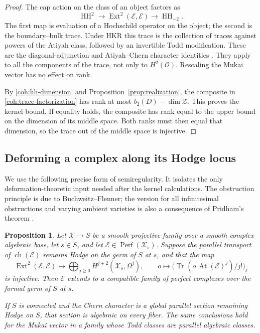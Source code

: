\documentclass[11pt]{article}
\numberwithin{equation}{section}
\newtheorem{proposition}[theorem]{Proposition}
\theoremstyle{definition}
\theoremstyle{remark}
\begin{document}
\begin{proof}
The cap action on the class of an object factors as
\begin{equation}\label{coh:trace-factorization}
 \operatorname{HH}^2\longrightarrow\operatorname{Ext}^2(\mathcal E,\mathcal E)
       \longrightarrow\operatorname{HH}_{-2}.
\end{equation}
The first map is evaluation of a Hochschild operator on the object;
the second is the boundary--bulk trace.  Under HKR this trace is the
collection of traces against powers of the Atiyah class, followed by
an invertible Todd modification.  These are the diagonal-adjunction
and Atiyah--Chern character identities
\cite{CaldararuMukaiII,BuchweitzFlennerHH}.
They apply to all the components of the trace, not only to
\(H^2(\mathcal O)\).  Rescaling the Mukai vector has no effect on rank.

By \eqref{coh:hh-dimension} and Proposition~\ref{prop:realization},
the composite in \eqref{coh:trace-factorization} has rank at most
\(b_2(D)-\dim\mathcal Z\).  This proves the kernel bound.  If
equality holds, the composite has rank equal to the upper bound on
the dimension of its middle space.  Both ranks must then equal that
dimension, so the trace out of the middle space is injective.
\end{proof}

\subsection{Deforming a complex along its Hodge locus}

We use the following precise form of semiregularity.  It isolates the
only deformation-theoretic input needed after the kernel calculations.
The obstruction principle is due to Buchweitz--Flenner; the version
for all infinitesimal obstructions and varying ambient varieties is
also a consequence of Pridham's theorem
\cite{BuchweitzFlennerSemiregularity,PridhamSemiregularity}.

\begin{proposition}\label{prop:semiregularity}
Let \(\mathscr X\to S\) be a smooth projective family over a smooth
complex algebraic base, let \(s\in S\), and let
\(\mathcal E\in\operatorname{Perf}(\mathscr X_s)\).  Suppose the parallel transport
of \(\operatorname{ch}(\mathcal E)\) remains Hodge on the germ of \(S\) at \(s\),
and that the map
\[
 \operatorname{Ext}^2(\mathcal E,\mathcal E)
 \longrightarrow\bigoplus_{j\ge0}H^{j+2}(\mathscr X_s,\Omega^j),
 \qquad o\longmapsto
  \bigl(\operatorname{Tr}(o\,\operatorname{At}(\mathcal E)^j)/j!\bigr)_j
\]
is injective.  Then \(\mathcal E\) extends to a compatible family of
perfect complexes over the formal germ of \(S\) at \(s\).

If \(S\) is connected and the Chern character is a global parallel
section remaining Hodge on \(S\), that section is algebraic on every
fiber.  The same conclusions hold for the Mukai vector in a family
whose Todd classes are parallel algebraic classes.
\end{proposition}
\end{document}
